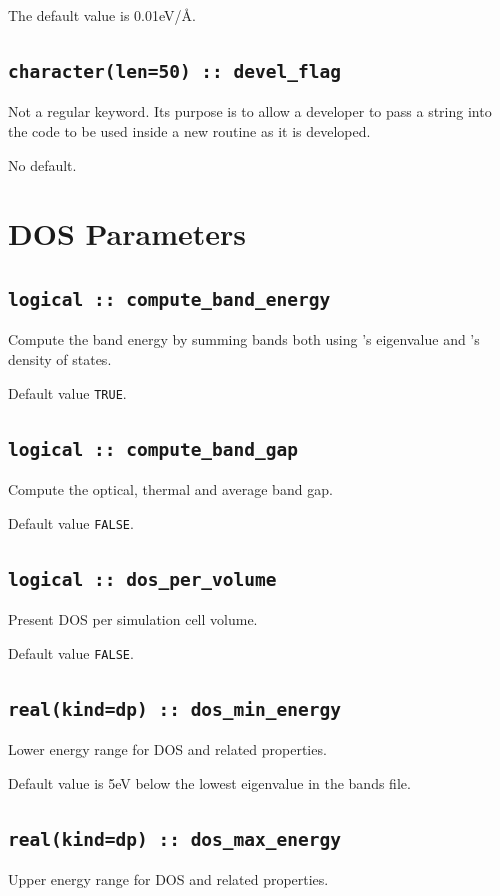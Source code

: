 \documentclass[a4paper,11pt,twoside]{book}
\begin{document}
{The default value is 0.01eV/\AA.


\subsection[devel\_flag]{\tt character(len=50) :: devel\_flag}

Not a regular keyword. Its purpose is to allow a developer to pass a
string into the code to be used inside a new routine as it is developed.

No default.



\section{DOS Parameters}

\subsection[compute\_band\_energy]{\tt logical :: compute\_band\_energy}
Compute the band energy by summing bands both using \castep's eigenvalue and \optados's density of states.

Default value \verb#TRUE#.

\subsection[compute\_band\_energy]{\tt logical :: compute\_band\_gap}
Compute the optical, thermal and average band gap.

Default value \verb#FALSE#.

\subsection[DOS\_per\_volume]{\tt logical :: dos\_per\_volume}
Present DOS per simulation cell volume.

Default value \verb#FALSE#.

\subsection[dos\_min\_energy]{\tt real(kind=dp) :: dos\_min\_energy}
Lower energy range for DOS and related properties.

Default value is 5eV below the lowest eigenvalue in the bands file.

\subsection[dos\_max\_energy]{\tt real(kind=dp) :: dos\_max\_energy}
Upper energy range for DOS and related properties.

}
\end{document}
